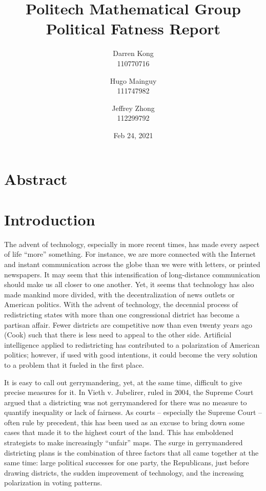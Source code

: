 \documentclass[letterpaper]{article}
\title{
	\textbf{Politech Mathematical Group} \\ 
	\vspace{2ex} 
	Political Fatness Report
	\vspace{2ex}
}
\author{
	Darren Kong \\ 110770716
	\and 
	Hugo Mainguy \\ 111747982
	\and 
	Jeffrey Zhong \\ 112299792
	\vspace{3ex}
}
\date{Feb 24, 2021}
\begin{document}
\begin{titlepage}
\maketitle
\thispagestyle{empty}
\end{titlepage}

\section{Abstract}
\section{Introduction}

The advent of technology, especially in more recent times, has made every aspect of life “more” something. For instance, we are more connected with the Internet and instant communication across the globe than we were with letters, or printed newspapers. It may seem that this intensification of long-distance communication should make us all closer to one another. Yet, it seems that technology has also made mankind more divided, with the decentralization of news outlets or American politics. With the advent of technology, the decennial process of redistricting states with more than one congressional district has become a partisan affair. Fewer districts are competitive now than even twenty years ago (Cook) such that there is less need to appeal to the other side. Artificial intelligence applied to redistricting has contributed to a polarization of American politics; however, if used with good intentions, it could become the very solution to a problem that it fueled in the first place.

It is easy to call out gerrymandering, yet, at the same time, difficult to give precise measures for it. In Vieth v. Jubelirer, ruled in 2004, the Supreme Court argued that a districting was not gerrymandered for there was no measure to quantify inequality or lack of fairness. As courts – especially the Supreme Court – often rule by precedent, this has been used as an excuse to bring down some cases that made it to the highest court of the land. This has emboldened strategists to make increasingly “unfair” maps. The surge in gerrymandered districting plans is the combination of three factors that all came together at the same time: large political successes for one party, the Republicans, just before drawing districts, the sudden improvement of technology, and the increasing polarization in voting patterns. 
\end{document}
